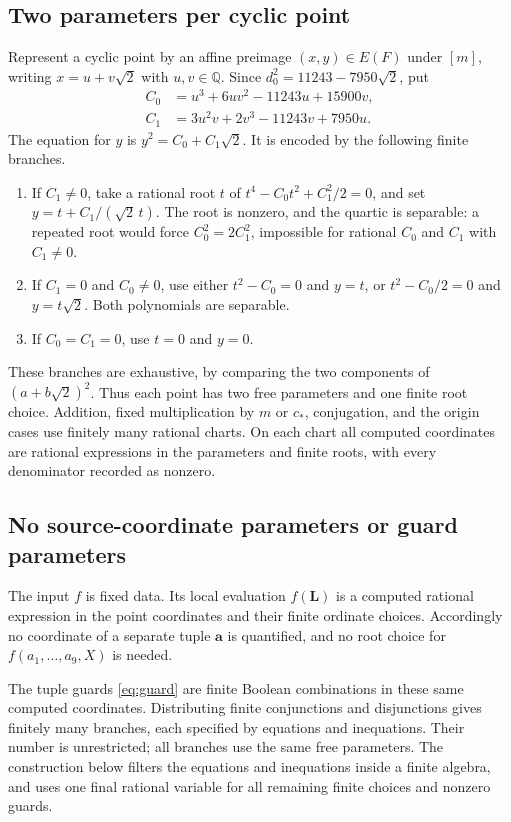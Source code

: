 \documentclass[11pt,reqno]{amsart}
\theoremstyle{definition}
\numberwithin{equation}{section}
\newcommand{\Q}{\mathbb Q}
\begin{document}
\subsection{Two parameters per cyclic point}
Represent a cyclic point by an affine preimage $(x,y)\in E(F)$ under $[m]$, writing $x=u+v\sqrt2$ with $u,v\in\Q$. Since $d_0^2=11243-7950\sqrt2$, put
\begin{align}
 C_0&=u^3+6uv^2-11243u+15900v,\label{eq:Czero}\\
 C_1&=3u^2v+2v^3-11243v+7950u.\label{eq:Cone}
\end{align}
The equation for $y$ is $y^2=C_0+C_1\sqrt2$. It is encoded by the following finite branches.
\begin{enumerate}
\item If $C_1\ne0$, take a rational root $t$ of
$t^4-C_0t^2+C_1^2/2=0$, and set
 $y=t+C_1/(\sqrt2\,t).$
The root is nonzero, and the quartic is separable: a repeated root would force $C_0^2=2C_1^2$, impossible for rational $C_0$ and $C_1$ with $C_1\ne0$.
\item If $C_1=0$ and $C_0\ne0$, use either $t^2-C_0=0$ and $y=t$, or $t^2-C_0/2=0$ and $y=t\sqrt2$. Both polynomials are separable.
\item If $C_0=C_1=0$, use $t=0$ and $y=0$.
\end{enumerate}
These branches are exhaustive, by comparing the two components of $(a+b\sqrt2)^2$. Thus each point has two free parameters and one finite root choice. Addition, fixed multiplication by $m$ or $c_\ast$, conjugation, and the origin cases use finitely many rational charts. On each chart all computed coordinates are rational expressions in the parameters and finite roots, with every denominator recorded as nonzero. 

\subsection{No source-coordinate parameters or guard parameters}
The input $f$ is fixed data. Its local evaluation $f(\mathbf L)$ is a computed rational expression in the point coordinates and their finite ordinate choices. Accordingly no coordinate of a separate tuple $\mathbf a$ is quantified, and no root choice for $f(a_1,\ldots,a_9,X)$ is needed.

The tuple guards \eqref{eq:guard} are finite Boolean combinations in these same computed coordinates. Distributing finite conjunctions and disjunctions gives finitely many branches, each specified by equations and inequations. Their number is unrestricted; all branches use the same free parameters. The construction below filters the equations and inequations inside a finite algebra, and uses one final rational variable for all remaining finite choices and nonzero guards.
\end{document}
